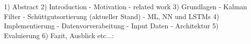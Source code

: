

1) Abstract 
2) Introduction
	- Motivation
	- related work
3) Grundlagen
	- Kalman Filter
	- Schüttgutsortierung (aktueller Stand)
	- ML, NN und LSTMs
4) Implementierung
	- Datenvorverabeitung
	- Input Daten
	- Architektur
5) Evaluierung
6) Fazit, Ausblick etc...: